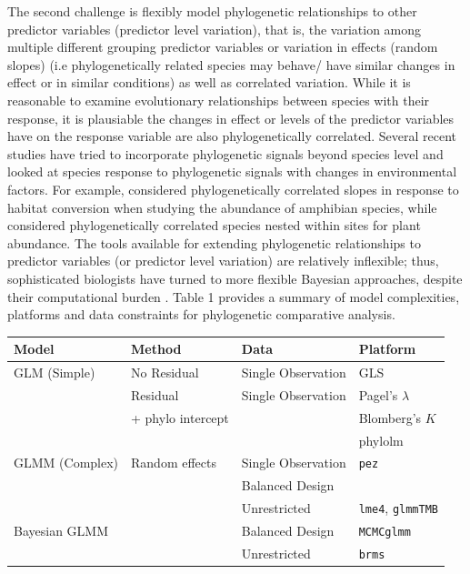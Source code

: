 The second challenge is flexibly model phylogenetic relationships to other predictor variables (predictor level variation), that is, the variation among multiple different grouping predictor variables or variation in effects (random slopes) (i.e phylogenetically related species may behave/ have similar changes in effect or in similar conditions) as well as correlated variation.
While it is reasonable to examine evolutionary relationships between species with their response, it is plausiable the changes in effect or levels of the predictor variables have on the response variable are also phylogenetically correlated. 
Several recent studies have tried to incorporate phylogenetic signals beyond species level and looked at species response to phylogenetic signals with changes in environmental factors.
For example, \cite{nowakowski2018phylogenetic} considered phylogenetically correlated slopes in response to habitat conversion when studying the abundance of amphibian species, while \cite{li2017canfun} considered phylogenetically correlated species nested within sites for plant abundance. 
The tools available for extending phylogenetic relationships to predictor variables (or predictor level variation) are relatively inflexible; thus, sophisticated biologists have turned to more flexible Bayesian approaches, despite their computational burden \cite{hadfield2010mcmc, burkner2016brms}.
Table 1 provides a summary of model complexities, platforms and data constraints for phylogenetic comparative analysis.

\newcommand{\pkg}[1]{{\tt #1}}
\newcommand{\code}[1]{{\tt #1}}

\begin{tabularx}{\textwidth}{|X|X|X|X|}
\hline
Model & Method & Data & Platform \\
\hline
\hline
GLM (Simple)  & No Residual & Single Observation & GLS \\
\hline
              & Residual    & Single Observation & Pagel's $\lambda$ \\
              & + phylo intercept &                    & Blomberg's $K$ \\ 
              &             &                    & phylolm \\
\hline
GLMM (Complex)& Random effects & Single Observation & \pkg{pez} \\ 
              &                & Balanced Design &  \\
\hline
              &                & Unrestricted  & \pkg{lme4}, \pkg{glmmTMB} \\
\hline
Bayesian GLMM &                & Balanced Design & \pkg{MCMCglmm} \\ 
\hline        
              &                & Unrestricted   & \pkg{brms} \\
\hline
\end{tabularx}


